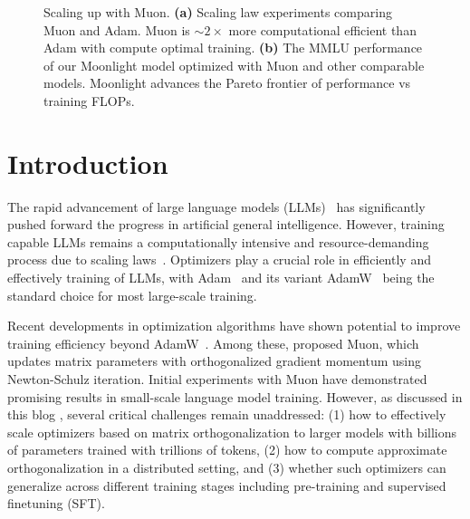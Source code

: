 

\begin{figure}[h]
    \centering
    \caption{Scaling up with Muon. \textbf{(a)} Scaling law experiments comparing Muon and Adam. Muon is $\sim2\times$ more computational efficient than Adam with compute optimal training. \textbf{(b)} The MMLU performance of our Moonlight model optimized with Muon and other comparable models. Moonlight advances the Pareto frontier of performance vs training FLOPs.} 
    \label{fig:teaser} 
\end{figure}

\section{Introduction}


The rapid advancement of large language models (LLMs)~\citep{openai2024gpt4technicalreport,deepseekai2024deepseekv3technicalreport,grattafiori2024llama3herdmodels,geminiteam2024geminifamilyhighlycapable} has significantly pushed forward the progress in artificial general intelligence. However, training capable LLMs remains a computationally intensive and resource-demanding process due to scaling laws~\citep{kaplan2020scalinglawsneurallanguage,hoffmann2022trainingcomputeoptimallargelanguage}. Optimizers play a crucial role in efficiently and effectively training of LLMs, with Adam~\citep{adam2015kingma} and its variant AdamW~\citep{loshchilov2018decoupled} being the standard choice for most large-scale training.

Recent developments in optimization algorithms have shown potential to improve training efficiency beyond AdamW~\citep{liu2024sophia,jordan2024muon,yuan2024mars,vyas2025soap,Li_2018,li2018preconditionermatrixliegroup,pooladzandi2024curvatureinformedsgdgeneralpurpose,li2022blackboxliegroup,li2024stochastichessianfittingslie,pethick2025trainingdeeplearningmodels}. Among these, \cite{jordan2024muon} proposed Muon, which updates matrix parameters with orthogonalized gradient momentum using Newton-Schulz iteration. Initial experiments with Muon have demonstrated promising results in small-scale language model training. However, as discussed in this blog \citep{jordan2024muon}, several critical challenges remain unaddressed: (1) how to effectively scale optimizers based on matrix orthogonalization to larger models with billions of parameters trained with trillions of tokens, (2) how to compute approximate orthogonalization in a distributed setting, and (3) whether such optimizers can generalize across different training stages including pre-training and supervised finetuning (SFT).


